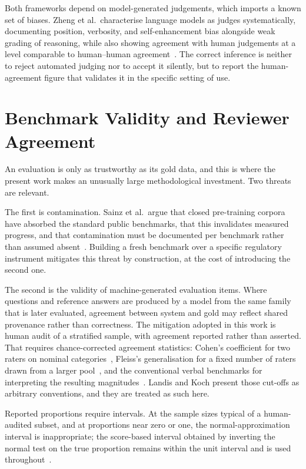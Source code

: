 Both frameworks depend on model-generated judgements, which imports a known set of biases. Zheng et al.\ characterise language models as judges systematically, documenting position, verbosity, and self-enhancement bias alongside weak grading of reasoning, while also showing agreement with human judgements at a level comparable to human--human agreement~\cite{zheng2023judging}. The correct inference is neither to reject automated judging nor to accept it silently, but to report the human-agreement figure that validates it in the specific setting of use.

\section{Benchmark Validity and Reviewer Agreement}
\label{sec:sota-validity}

An evaluation is only as trustworthy as its gold data, and this is where the present work makes an unusually large methodological investment. Two threats are relevant.

The first is contamination. Sainz et al.\ argue that closed pre-training corpora have absorbed the standard public benchmarks, that this invalidates measured progress, and that contamination must be documented per benchmark rather than assumed absent~\cite{sainz2023contamination}. Building a fresh benchmark over a specific regulatory instrument mitigates this threat by construction, at the cost of introducing the second one.

The second is the validity of machine-generated evaluation items. Where questions and reference answers are produced by a model from the same family that is later evaluated, agreement between system and gold may reflect shared provenance rather than correctness. The mitigation adopted in this work is human audit of a stratified sample, with agreement reported rather than asserted. That requires chance-corrected agreement statistics: Cohen's coefficient for two raters on nominal categories~\cite{cohen1960coefficient}, Fleiss's generalisation for a fixed number of raters drawn from a larger pool~\cite{fleiss1971measuring}, and the conventional verbal benchmarks for interpreting the resulting magnitudes~\cite{landis1977measurement}. Landis and Koch present those cut-offs as arbitrary conventions, and they are treated as such here.

Reported proportions require intervals. At the sample sizes typical of a human-audited subset, and at proportions near zero or one, the normal-approximation interval is inappropriate; the score-based interval obtained by inverting the normal test on the true proportion remains within the unit interval and is used throughout~\cite{wilson1927probable}.

